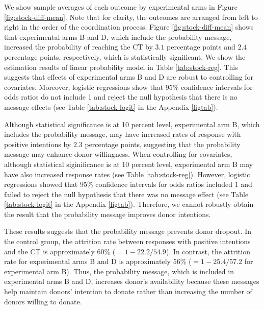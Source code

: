 \documentclass[12pt, a4paper]{article}
\begin{document}
We show sample averages of each outcome by experimental arms in Figure \ref{fig:stock-diff-mean}. Note that for clarity, the outcomes are arranged from left to right in the order of the coordination process. Figure \ref{fig:stock-diff-mean} shows that experimental arms B and D, which include the probability message, increased the probability of reaching the CT by \(3.1\) percentage points and \(2.4\) percentage points, respectively, which is statistically significant. We show the estimation results of linear probability model in Table \ref{tab:stock-reg}. This suggests that effects of experimental arms B and D are robust to controlling for covariates. Moreover, logistic regressions show that 95\% confidence intervals for odds ratios do not include 1 and reject the null hypothesis that there is no message effects (see Table \ref{tab:stock-logit} in the Appendix \ref{figtab}).

Although statistical significance is at 10 percent level, experimental arm B, which includes the probability message, may have increased rates of response with positive intentions by \(2.3\) percentage points, suggesting that the probability message may enhance donor willingness. When controlling for covariates, although statistical siginificance is at 10 percent level, experimental arm B may have also increased response rates (see Table \ref{tab:stock-reg}). However, logistic regressions showed that 95\% confidence intervals for odds ratios included 1 and failed to reject the null hypothesis that there was no message effect (see Table \ref{tab:stock-logit} in the Appendix \ref{figtab}). Therefore, we cannot robustly obtain the result that the probability message improves donor intentions.

These results suggests that the probability message prevents donor dropout. In the control group, the attrition rate between responses with positive intentions and the CT is approximately 60\% (\(=1 - 22.2/54.9\)). In contrast, the attrition rate for experimental arms B and D is approximately 56\% (\(=1 - 25.4/57.2\) for experimental arm B). Thus, the probability message, which is included in experimental arms B and D, increases donor's availability because these messages help maintain donors' intention to donate rather than increasing the number of donors willing to donate.
\end{document}

